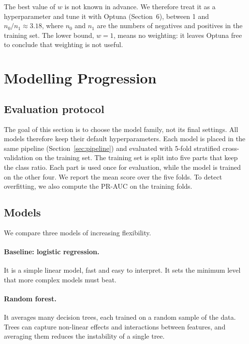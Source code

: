 \documentclass[10pt,a4paper]{article}
\begin{document}
The best value of $w$ is not known in advance. We therefore treat it as a hyperparameter
and tune it with Optuna (Section~6), between 1 and $n_0/n_1 \approx 3.18$, where $n_0$
and $n_1$ are the numbers of negatives and positives in the training set. The lower
bound, $w = 1$, means no weighting: it leaves Optuna free to conclude that weighting is
not useful.

\section{Modelling Progression}
\label{sec:models}

\subsection{Evaluation protocol}
The goal of this section is to choose the model family, not its final settings. All
models therefore keep their default hyperparameters. Each model is placed in the same pipeline (Section~\ref{sec:pipeline})
and evaluated with 5-fold stratified cross-validation on the training set. The
training set is split into five parts that keep the class ratio. Each part is used once
for evaluation, while the model is trained on the other four. We report the mean score
over the five folds. To detect overfitting, we also compute the PR-AUC on the training
folds.

\subsection{Models}
We compare three models of increasing flexibility.

\paragraph{Baseline: logistic regression.} It is a simple linear model, fast and easy to
interpret. It sets the minimum level that more complex models must beat.

\paragraph{Random forest.} It averages many decision trees, each trained on a random
sample of the data. Trees can capture non-linear effects and interactions between
features, and averaging them reduces the instability of a single tree.
\end{document}
